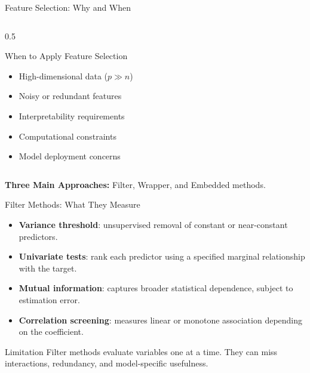 \documentclass[aspectratio=169,11pt]{beamer}
\begin{document}
\begin{frame}{Feature Selection: Why and When}
\begin{columns}
\begin{column}{0.5\textwidth}
\begin{block}{When to Apply Feature Selection}
\begin{itemize}
\item High-dimensional data ($p \gg n$)
\item Noisy or redundant features
\item Interpretability requirements
\item Computational constraints
\item Model deployment concerns
\end{itemize}
\end{block}
\end{column}
\end{columns}

\textbf{Three Main Approaches:} Filter, Wrapper, and Embedded methods.
\end{frame}

\begin{frame}{Filter Methods: What They Measure}
\begin{itemize}
  \item \textbf{Variance threshold}: unsupervised removal of constant or near-constant predictors.
  \item \textbf{Univariate tests}: rank each predictor using a specified marginal relationship with the target.
  \item \textbf{Mutual information}: captures broader statistical dependence, subject to estimation error.
  \item \textbf{Correlation screening}: measures linear or monotone association depending on the coefficient.
\end{itemize}

\begin{alertblock}{Limitation}
Filter methods evaluate variables one at a time. They can miss interactions, redundancy, and model-specific usefulness.
\end{alertblock}
\end{frame}
\end{document}
